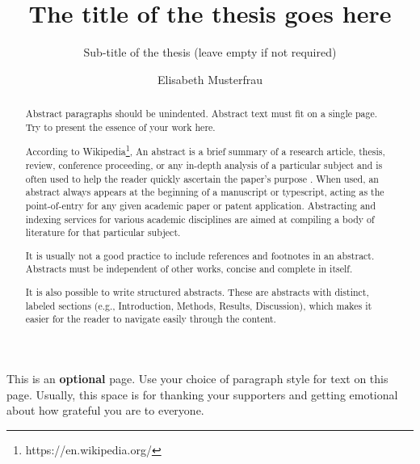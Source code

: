 \documentclass{imc-inf}
\title{The title of the thesis goes here}
\subtitle{Sub-title of the thesis (leave empty if not required)}
\author{Elisabeth Musterfrau}
\begin{document}
\frontmatter\maketitle{}


\begin{declarations}\end{declarations}



\begin{abstract}
	Abstract paragraphs should be unindented. Abstract text must fit on a single page. Try to present the essence of your work here. 
	
	According to Wikipedia\footnote{https://en.wikipedia.org/}, An abstract is a brief summary of a research article, thesis, review, conference proceeding, or any in-depth analysis of a particular subject and is often used to help the reader quickly ascertain the paper's purpose \cite{988366}. When used, an abstract always appears at the beginning of a manuscript or typescript, acting as the point-of-entry for any given academic paper or patent application. Abstracting and indexing services for various academic disciplines are aimed at compiling a body of literature for that particular subject.
	
	It is usually not a good practice to include references and footnotes in an abstract. Abstracts must be independent of other works, concise and complete in itself. 
	
	It is also possible to write structured abstracts. These are abstracts with distinct, labeled sections (e.g., Introduction, Methods, Results, Discussion), which makes it easier for the reader to navigate easily through the content. 
	
\end{abstract}


\begin{acknowledgements}
This is an \textbf{optional} page. Use your choice of paragraph style for text on this page. Usually, this space is for thanking your supporters and getting emotional about how grateful you are to everyone.  
\end{acknowledgements}

%
\tableofcontents%
\clearpage


%
\listoftables
\clearpage


%
\listoffigures
\clearpage


\mainmatter%
\end{document}
